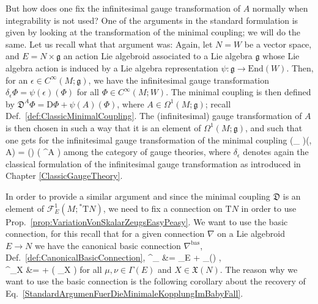But how does one fix the infinitesimal gauge transformation of $A$ normally when integrability is not used? One of the arguments in the standard formulation is given by looking at the transformation of the minimal coupling; we will do the same. Let us recall what that argument was: Again, let $N =W$ be a vector space, and $E = N \times \mathfrak{g}$ an action Lie algebroid associated to a Lie algebra $\mathfrak{g}$ whose Lie algebra action is induced by a Lie algebra representation $\psi: \mathfrak{g} \to \mathrm{End}(W)$. Then, for an $\epsilon \in C^\infty(M; \mathfrak{g})$, we have the infinitesimal gauge transformation $\delta_\epsilon \Phi = \psi(\epsilon)(\Phi)$ for all $\Phi \in C^\infty(M;W)$. The minimal coupling is then defined by $\mathfrak{D}^A \Phi = \mathrm{D}\Phi + \psi(A)(\Phi)$, where $A \in \Omega^1(M; \mathfrak{g})$; recall Def.~\ref{def:ClassicMinimalCoupling}. The (infinitesimal) gauge transformation of $A$ is then chosen in such a way that it is an element of $\Omega^1(M; \mathfrak{g})$, and such that one gets for the infinitesimal gauge transformation of the minimal coupling
\ba\label{StandardArgumenFuerDieMinimaleKopplungImBabyFall}
\mleft(\delta_\epsilon {} \mright)(\Phi, A)
= 
\psi(\epsilon) \mleft( ^A \Phi \mright)
\ea
among the category of gauge theories, where $\delta_\epsilon$ denotes again the classical formulation of the infinitesimal gauge transformation as introduced in Chapter \ref{ClassicGaugeTheory}.

In order to provide a similar argument and since the minimal coupling $\mathfrak{D}$ is an element of $\mathcal{F}^1_E(M; {}^*\mathrm{T}N)$, we need to fix a connection on $\mathrm{T}N$ in order to use Prop.~\ref{prop:VariationVonSkalarZeugsEasyPeasy}. We want to use the basic connection, for this recall that for a given connection $\nabla$ on a Lie algebroid $E\to N$ we have the canonical basic connection $\nabla^{\mathrm{bas}}$, Def.~\ref{def:CanonicalBasicConnection},
\bas
\nabla^{}_\mu \nu
&=
\mleft[ \mu, \nu \mright]_E + \nabla_{\rho(\nu)} \mu, \\
\nabla^{}_\mu X
&=
 + \rho \mleft( \nabla_{X} \mu \mright)
\eas
for all $\mu, \nu \in \Gamma(E)$ and $X\in \mathfrak{X}(N)$. The reason why we want to use the basic connection is the following corollary about the recovery of Eq.~\eqref{StandardArgumenFuerDieMinimaleKopplungImBabyFall}.

